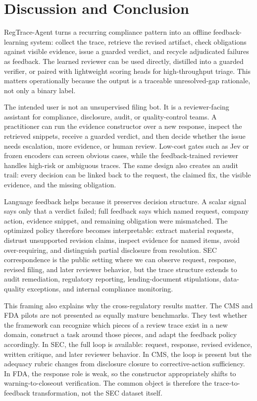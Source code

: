 \documentclass[11pt]{article}
\newcommand{\framework}{RegTrace-Agent}
\begin{document}
\section{Discussion and Conclusion}

\framework{} turns a recurring compliance pattern into an offline feedback-learning system: collect the trace, retrieve the revised artifact, check obligations against visible evidence, issue a guarded verdict, and recycle adjudicated failures as feedback. The learned reviewer can be used directly, distilled into a guarded verifier, or paired with lightweight scoring heads for high-throughput triage. This matters operationally because the output is a traceable unresolved-gap rationale, not only a binary label.

The intended user is not an unsupervised filing bot. It is a reviewer-facing assistant for compliance, disclosure, audit, or quality-control teams. A practitioner can run the evidence constructor over a new response, inspect the retrieved snippets, receive a guarded verdict, and then decide whether the issue needs escalation, more evidence, or human review. Low-cost gates such as Jev or frozen encoders can screen obvious cases, while the feedback-trained reviewer handles high-risk or ambiguous traces. The same design also creates an audit trail: every decision can be linked back to the request, the claimed fix, the visible evidence, and the missing obligation.

Language feedback helps because it preserves decision structure. A scalar signal says only that a verdict failed; full feedback says which named request, company action, evidence snippet, and remaining obligation were mismatched. The optimized policy therefore becomes interpretable: extract material requests, distrust unsupported revision claims, inspect evidence for named items, avoid over-requiring, and distinguish partial disclosure from resolution. SEC correspondence is the public setting where we can observe request, response, revised filing, and later reviewer behavior, but the trace structure extends to audit remediation, regulatory reporting, lending-document stipulations, data-quality exceptions, and internal compliance monitoring.

This framing also explains why the cross-regulatory results matter. The CMS and FDA pilots are not presented as equally mature benchmarks. They test whether the framework can recognize which pieces of a review trace exist in a new domain, construct a task around those pieces, and adapt the feedback policy accordingly. In SEC, the full loop is available: request, response, revised evidence, written critique, and later reviewer behavior. In CMS, the loop is present but the adequacy rubric changes from disclosure closure to corrective-action sufficiency. In FDA, the response role is weak, so the constructor appropriately shifts to warning-to-closeout verification. The common object is therefore the trace-to-feedback transformation, not the SEC dataset itself.
\end{document}
